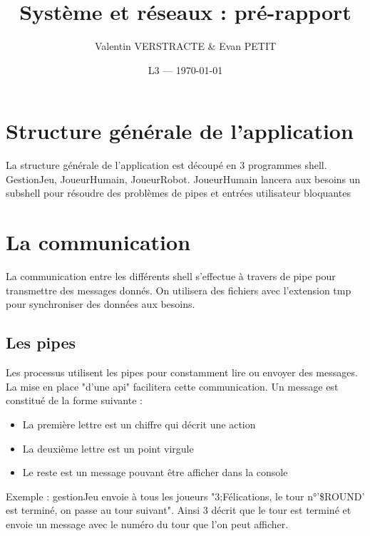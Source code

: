 \documentclass{article}
\title{Système et réseaux : pré-rapport} %
\author{Valentin VERSTRACTE \& Evan PETIT}
\date{L3 --- \today} %
\begin{document}
\maketitle %



\section{Structure générale de l'application}
La structure générale de l'application est découpé en 3 programmes shell. GestionJeu, JoueurHumain, JoueurRobot. JoueurHumain lancera aux besoins un subshell pour résoudre des problèmes de pipes et entrées utilisateur bloquantes

\section{La communication}
La communication entre les différents shell s'effectue à travers de pipe pour transmettre des messages donnés. On utilisera des fichiers avec l'extension tmp pour synchroniser des données aux besoins. 

\subsection{Les pipes}
Les processus utilisent les pipes pour constamment lire ou envoyer des messages. La mise en place "d'une api" facilitera cette communication. Un message est constitué de la forme suivante :

\begin{itemize}
\item La première lettre est un chiffre qui décrit une action  
\item La deuxième lettre est un point virgule
\item Le reste est un message pouvant être afficher dans la console 
\end{itemize}

Exemple : gestionJeu envoie à tous les joueurs "3;Félications, le tour n°'\$ROUND' est terminé, on passe au tour suivant". Ainsi 3 décrit que le tour est terminé et envoie un message avec le numéro du tour que l'on peut afficher. 
\end{document}
